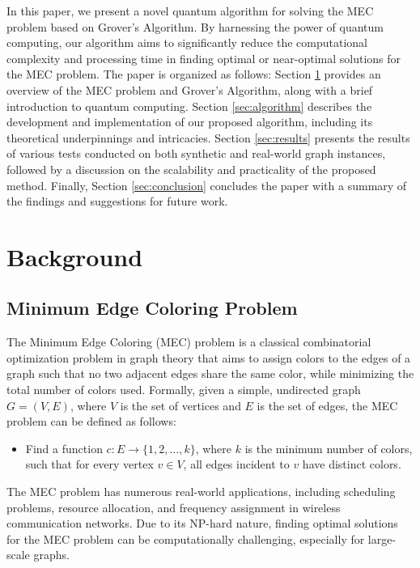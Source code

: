 In this paper, we present a novel quantum algorithm for solving the MEC problem based on Grover's Algorithm. By harnessing the power of quantum computing, our algorithm aims to significantly reduce the computational complexity and processing time in finding optimal or near-optimal solutions for the MEC problem. The paper is organized as follows: Section \ref{sec:background} provides an overview of the MEC problem and Grover's Algorithm, along with a brief introduction to quantum computing. Section \ref{sec:algorithm} describes the development and implementation of our proposed algorithm, including its theoretical underpinnings and intricacies. Section \ref{sec:results} presents the results of various tests conducted on both synthetic and real-world graph instances, followed by a discussion on the scalability and practicality of the proposed method. Finally, Section \ref{sec:conclusion} concludes the paper with a summary of the findings and suggestions for future work.

\section{Background}\label{sec:background}

\subsection{Minimum Edge Coloring Problem}\label{subsec:mec}

The Minimum Edge Coloring (MEC) problem is a classical combinatorial optimization problem in graph theory that aims to assign colors to the edges of a graph such that no two adjacent edges share the same color, while minimizing the total number of colors used. Formally, given a simple, undirected graph $G = (V, E)$, where $V$ is the set of vertices and $E$ is the set of edges, the MEC problem can be defined as follows:

\begin{itemize}
    \item Find a function $c: E \rightarrow \{1, 2, \ldots, k\}$, where $k$ is the minimum number of colors, such that for every vertex $v \in V$, all edges incident to $v$ have distinct colors.
\end{itemize}

The MEC problem has numerous real-world applications, including scheduling problems, resource allocation, and frequency assignment in wireless communication networks. Due to its NP-hard nature, finding optimal solutions for the MEC problem can be computationally challenging, especially for large-scale graphs.

